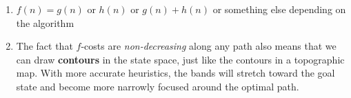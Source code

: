 \begin{enumerate}[itemsep=0.2cm]
\begin{enumerate}[itemsep=0.2cm]
        \item $f(n) = g(n)$ or $h(n)$ or $g(n)+h(n)$ or something else depending on the algorithm

        \item The fact that $f$-costs are \textit{non-decreasing} along any path also means that we can draw \textbf{contours} in the state space, just like the contours in a topographic map. 
        With more accurate heuristics, the bands will stretch toward the goal state and become more narrowly focused around the optimal path.
        \hfill \cite{ai/book/Artificial-Intelligence-A-Modern-Approach/Russell-Norvig}
    \end{enumerate}
\end{enumerate}




















\clearpage


